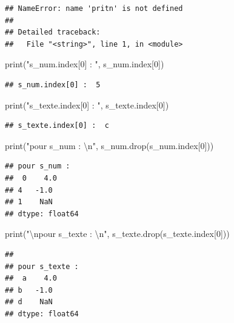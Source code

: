 \documentclass[12pt,]{book}
\newenvironment{Shaded}{\begin{snugshade}}{\end{snugshade}}
\newcommand{\DecValTok}[1]{\textcolor[rgb]{0.00,0.00,0.81}{#1}}
\newcommand{\CharTok}[1]{\textcolor[rgb]{0.31,0.60,0.02}{#1}}
\newcommand{\StringTok}[1]{\textcolor[rgb]{0.31,0.60,0.02}{#1}}
\newcommand{\BuiltInTok}[1]{#1}
\newcommand{\NormalTok}[1]{#1}
\numberwithin{equation}{section}
\numberwithin{countremarque}{section}
\begin{document}
\begin{lstlisting}
## NameError: name 'pritn' is not defined
## 
## Detailed traceback: 
##   File "<string>", line 1, in <module>
\end{lstlisting}

\begin{Shaded}
\begin{Highlighting}[]
\BuiltInTok{print}\NormalTok{(}\StringTok{"s_num.index[0] : "}\NormalTok{, s_num.index[}\DecValTok{0}\NormalTok{])}
\end{Highlighting}
\end{Shaded}

\begin{lstlisting}
## s_num.index[0] :  5
\end{lstlisting}

\begin{Shaded}
\begin{Highlighting}[]
\BuiltInTok{print}\NormalTok{(}\StringTok{"s_texte.index[0] : "}\NormalTok{, s_texte.index[}\DecValTok{0}\NormalTok{])}
\end{Highlighting}
\end{Shaded}

\begin{lstlisting}
## s_texte.index[0] :  c
\end{lstlisting}

\begin{Shaded}
\begin{Highlighting}[]
\BuiltInTok{print}\NormalTok{(}\StringTok{"pour s_num : }\CharTok{\textbackslash{}n}\StringTok{"}\NormalTok{, s_num.drop(s_num.index[}\DecValTok{0}\NormalTok{]))}
\end{Highlighting}
\end{Shaded}

\begin{lstlisting}
## pour s_num : 
##  0    4.0
## 4   -1.0
## 1    NaN
## dtype: float64
\end{lstlisting}

\begin{Shaded}
\begin{Highlighting}[]
\BuiltInTok{print}\NormalTok{(}\StringTok{"}\CharTok{\textbackslash{}n}\StringTok{pour s_texte : }\CharTok{\textbackslash{}n}\StringTok{"}\NormalTok{, s_texte.drop(s_texte.index[}\DecValTok{0}\NormalTok{]))}
\end{Highlighting}
\end{Shaded}

\begin{lstlisting}
## 
## pour s_texte : 
##  a    4.0
## b   -1.0
## d    NaN
## dtype: float64
\end{lstlisting}
\end{document}
